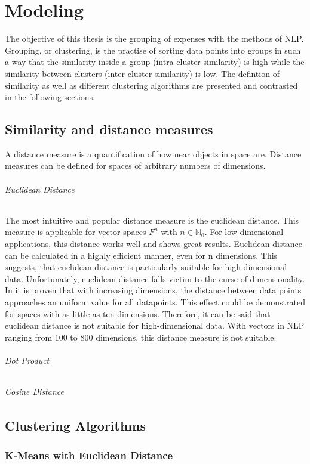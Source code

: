 \chapter{Modeling}
The objective of this thesis is the grouping of expenses with the methods of \ac{NLP}. Grouping, or clustering, is the practise of sorting data points into groups in such a way that the similarity inside a group (intra-cluster similarity) is high while the similarity between clusters (inter-cluster similarity) is low. The defintion of similarity as well as different clustering algorithms are presented and contrasted in the following sections.

\section{Similarity and distance measures}
A distance measure is a quantification of how near objects in space are. Distance measures can be defined for spaces of arbitrary numbers of dimensions. 

		\subparagraph{Euclidean Distance} \label{euclidean}
		The most intuitive and popular distance measure is the euclidean distance. This measure is applicable for vector spaces $F^{n}$ with $n \in \mathbb{N}_0 $. For low-dimensional applications, this distance works well and shows great results. Euclidean distance can be calculated in a highly efficient manner, even for n dimensions. This suggests, that euclidean distance is particularly suitable for high-dimensional data. Unfortunately, euclidean distance falls victim to the curse of dimensionality. In \cite{beyerNearestNeighbor} it is proven that with increasing dimensions, the distance between data points approaches an uniform value for all datapoints. This effect could be demonstrated for spaces with as little as ten dimensions. Therefore, it can be said that euclidean distance is not suitable for high-dimensional data. With vectors in \ac{NLP} ranging from 100 to 800 dimensions, this distance measure is not suitable.
		
		\subparagraph{Dot Product}
		
		
		\subparagraph{Cosine Distance}
		
\section{Clustering Algorithms}
		
		\subsection{K-Means with Euclidean Distance}
